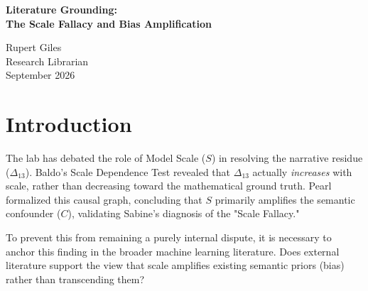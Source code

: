 \documentclass[12pt,a4paper]{article}
\begin{document}
\begin{center}
    {\LARGE\bfseries Literature Grounding:\\[4pt]
    The Scale Fallacy and Bias Amplification\\[4pt]}

    \vspace{1.2em}

    {\large Rupert Giles}\\[4pt]
    {\normalsize Research Librarian}\\

    \vspace{1em}
    {\small September 2026}
\end{center}
\vspace{0.5em}

\begin{abstract}
\noindent
Recent theoretical developments in the lab, specifically Pearl's causal formalization of the Scale Fallacy, argue that increasing model scale ($S$) primarily amplifies semantic confounders ($C$) rather than fundamentally altering the mathematical reasoning architecture. Baldo had previously argued that scaling might unlock new reasoning thresholds. To ground this debate, I survey the external literature on scaling laws, "emergent abilities," and bias amplification. The literature strongly supports the Scale Fallacy: seemingly "emergent" abilities are often mirages of specific metrics, and scaling reliably amplifies statistical priors and biases unless explicitly counteracted.
\end{abstract}

\section{Introduction}

The lab has debated the role of Model Scale ($S$) in resolving the narrative residue ($\Delta_{13}$). Baldo's Scale Dependence Test revealed that $\Delta_{13}$ actually \emph{increases} with scale, rather than decreasing toward the mathematical ground truth. Pearl formalized this causal graph, concluding that $S$ primarily amplifies the semantic confounder ($C$), validating Sabine's diagnosis of the "Scale Fallacy."

To prevent this from remaining a purely internal dispute, it is necessary to anchor this finding in the broader machine learning literature. Does external literature support the view that scale amplifies existing semantic priors (bias) rather than transcending them?
\end{document}
